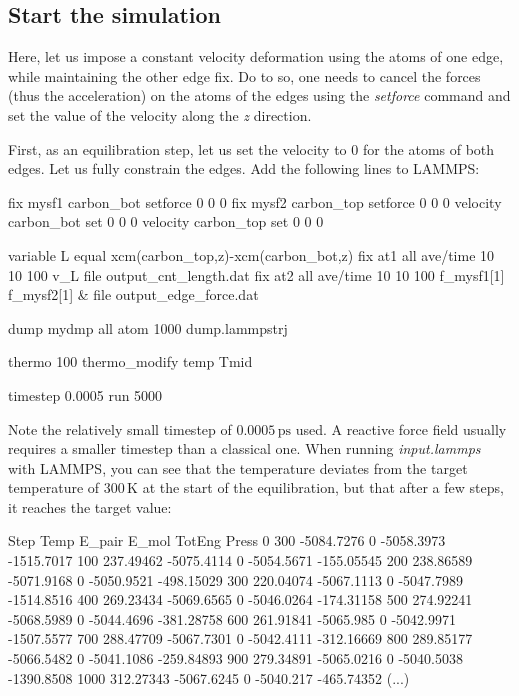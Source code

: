\subsection{Start the simulation}
\noindent Here, let us impose a constant velocity deformation using the atoms
of one edge, while maintaining the other edge fix. Do to so,
one needs to cancel the forces (thus the acceleration) on
the atoms of the edges using the \textit{setforce} command and set
the value of the velocity along the \textit{z} direction.

\vspace{0.25cm} \noindent First, as an equilibration step, let us set the velocity to 0
for the atoms of both edges. Let us fully constrain the edges.
Add the following lines to LAMMPS:

\begin{lcverbatim}
fix mysf1 carbon_bot setforce 0 0 0
fix mysf2 carbon_top setforce 0 0 0
velocity carbon_bot set 0 0 0
velocity carbon_top set 0 0 0

variable L equal xcm(carbon_top,z)-xcm(carbon_bot,z)
fix at1 all ave/time 10 10 100 v_L file output_cnt_length.dat
fix at2 all ave/time 10 10 100 f_mysf1[1] f_mysf2[1] &
    file output_edge_force.dat

dump mydmp all atom 1000 dump.lammpstrj

thermo 100
thermo_modify temp Tmid

timestep 0.0005
run 5000
\end{lcverbatim}

\noindent Note the relatively small timestep of $0.0005\,\text{ps}$
used. A reactive force field usually requires a smaller timestep
than a classical one.
When running \textit{input.lammps} with LAMMPS, you can see that the
temperature deviates from the target temperature of $300\,\text{K}$
at the start of the equilibration, but that
after a few steps, it reaches the target value:

\begin{lcverbatim}
Step  Temp           E_pair         E_mol          TotEng         Press     
0     300           -5084.7276      0             -5058.3973     -1515.7017    
100   237.49462     -5075.4114      0             -5054.5671     -155.05545    
200   238.86589     -5071.9168      0             -5050.9521     -498.15029    
300   220.04074     -5067.1113      0             -5047.7989     -1514.8516    
400   269.23434     -5069.6565      0             -5046.0264     -174.31158    
500   274.92241     -5068.5989      0             -5044.4696     -381.28758    
600   261.91841     -5065.985       0             -5042.9971     -1507.5577    
700   288.47709     -5067.7301      0             -5042.4111     -312.16669    
800   289.85177     -5066.5482      0             -5041.1086     -259.84893    
900   279.34891     -5065.0216      0             -5040.5038     -1390.8508    
1000  312.27343     -5067.6245      0             -5040.217      -465.74352
(...)
\end{lcverbatim}

